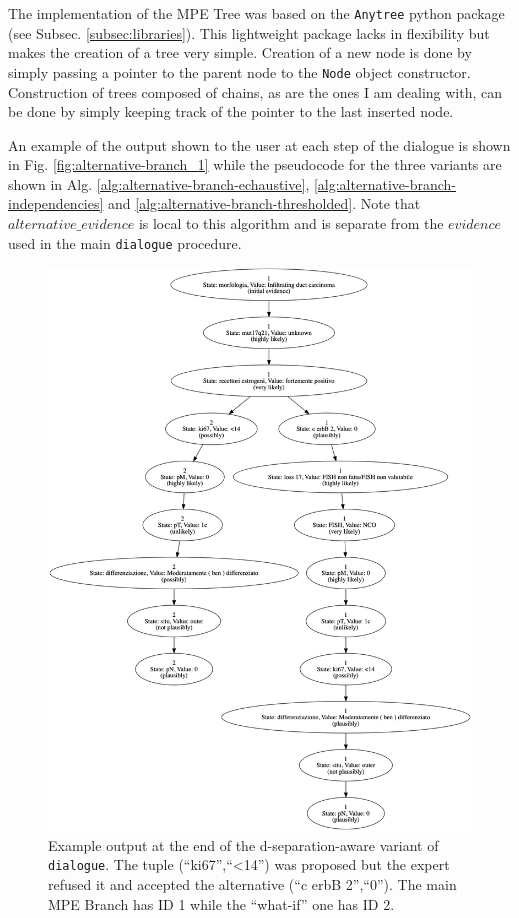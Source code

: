 The implementation of the MPE Tree was based on the \texttt{Anytree} python package (see Subsec. \ref{subsec:libraries}).
This lightweight package lacks in flexibility but makes the creation of a tree very simple.
Creation of a new node is done by simply passing a pointer to the parent node to the \texttt{Node} object constructor.
Construction of trees composed of chains, as are the ones I am dealing with, can be done by simply keeping track of the pointer to the last inserted node.

An example of the output shown to the user at each step of the dialogue is shown in Fig. \ref{fig:alternative-branch_1} while the pseudocode for the three variants are shown in Alg. \ref{alg:alternative-branch-echaustive}, \ref{alg:alternative-branch-independencies} and \ref{alg:alternative-branch-thresholded}.
Note that $alternative\_evidence$ is local to this algorithm and is separate from the $evidence$ used in the main \texttt{dialogue} procedure.

\begin{figure}[htbp]
\centerline{\includegraphics[width=\columnwidth]{methodology/images/alternative-explanation-tree-example}}
\caption{Example output at the end of the d-separation-aware variant of \texttt{dialogue}.
	The tuple (\enquote{ki67},\enquote{<14}) was proposed but the expert refused it and accepted the alternative (\enquote{c erbB 2},\enquote{0}).
	The main MPE Branch has ID 1 while the \enquote{what-if} one has ID 2.}
\label{fig:alternative-branch}
\end{figure}

